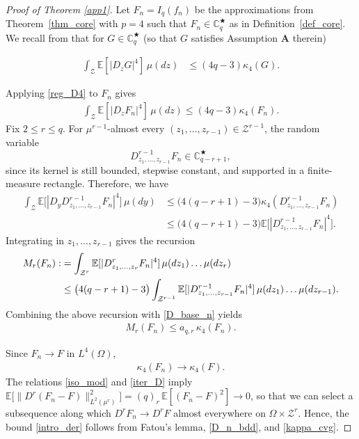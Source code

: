 \documentclass[ECP,preprint]{ejpecp}
\newcommand{\E}{\mathbb{E}}
\newcommand{\cZ}{\mathcal{Z}}
\newcommand{\fin}{\mathbb{C}^{\bigstar}}
\newcommand{\noi}{\noindent}
\begin{document}
\begin{proof}[Proof of Theorem \ref{app1}]
Let $F_n=I_q(f_n)$ be the approximations from
Theorem~\ref{thm_core} with $p=4$ such that $F_n\in\fin_q$ 
as in Definition~\ref{def_core}.  
We recall   from \cite[Lem.~3.2]{DP18}
that for $G\in\fin_q$ (so that $G$ satisfies   Assumption $\mathbf{A}$ therein)

\noi
\begin{align}
  \int_\cZ\E[|D_zG|^4]\,\mu(dz)
  &\leq(4q-3)\kappa_4(G).
  \label{reg_D4}
\end{align}



\noi
Applying
\eqref{reg_D4} to $F_n$ gives
\begin{align}
   \int_\cZ\E[|D_z F_n|^4]\,\mu(dz)
  \leq(4q-3)\kappa_4(F_n).
  \label{D_base_n}
\end{align}
Fix $2\leq r\leq q$.  For $\mu^{r-1}$-almost every
$(z_1,\ldots,z_{r-1})\in\cZ^{r-1}$, the random variable
\[
  D^{r-1}_{z_1, ..., z_{r-1}}F_n \in\fin_{q-r+1},
\]
since its kernel is still bounded, stepwise constant, and supported in
a finite-measure rectangle. 
 Therefore, we have 
\[
\begin{aligned}
  \int_\cZ\E\bigl[|D_y    D^{r-1}_{z_1, ..., z_{r-1}}F_n     |^4\bigr] \,\mu(dy)
  &\leq
  \bigl(4(q-r+1)-3\bigr)
  \kappa_4( D^{r-1}_{z_1, ..., z_{r-1}}F_n)\\
  &\leq
  \bigl(4(q-r+1)-3\bigr)
  \E\bigl[| D^{r-1}_{z_1, ..., z_{r-1}}F_n |^4\bigr].
\end{aligned}
\]
Integrating in $z_1, ..., z_{r-1}$ gives the recursion
\begin{align}
  M_r(F_n):&= \int_{\cZ^r}\E[|D^r_{z_1, ..., z_r} F_n|^4]\,\mu(dz_1)\ldots \mu(dz_r)
   \label{MRN} \\
  &\leq
  \bigl(4(q-r+1)-3\bigr) \int_{\cZ^{r-1}}\E[|D^{r-1}_{z_1, ..., z_{r-1}} F_n|^4]\,\mu(dz_1)\ldots \mu(dz_{r-1}).
  \notag
\end{align}
Combining the above recursion with  \eqref{D_base_n}  yields
\begin{align}
  M_r(F_n)
  \leq a_{q,r} \, \kappa_4(F_n).
  \label{D_n_bdd}
\end{align}

Since $F_n\to F$ in $L^4(\Omega)$,
\begin{align}
  \kappa_4(F_n)\longrightarrow\kappa_4(F).
  \label{kappa_cvg}
\end{align}
The  relations \eqref{iso_mod} 
and \eqref{iter_D} imply
$\E\big[ \| D^r(F_n - F) \|^2_{L^2(\mu^r)} \big] 
=(q)_r \, \E[(F_n-F)^2] \to 0$,
so that 
we can  select a subsequence along which
$D^rF_n\to D^rF$ almost everywhere on $\Omega\times \cZ^r$.  
Hence, the   bound \eqref{intro_der}
follows from 
Fatou's lemma, \eqref{D_n_bdd}, and \eqref{kappa_cvg}.
\qedhere






\end{proof}
\end{document}
